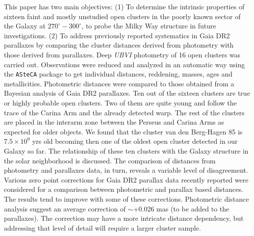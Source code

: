 \documentclass[draft]{aa}
\begin{document}
\abstract
{}
{This paper has two main objectives:
(1) To determine the intrinsic properties of sixteen faint and mostly
unstudied open clusters in the poorly known sector
of the Galaxy at $270^\circ-300^\circ$, to probe the Milky Way
structure in future investigations.
(2) To address previously reported systematics in Gaia DR2 parallaxes by
comparing the cluster distances derived from photometry with
those derived from parallaxes.
}
%
{Deep \textit{UBVI} photometry of 16 open clusters was carried out.
Observations were reduced and analyzed in an automatic way using the 
\texttt{ASteCA} package to get individual distances, reddening,
masses, ages and metallicities. Photometric distances were compared to
those obtained from a Bayesian analysis of Gaia DR2 parallaxes.
}
%
{Ten out of the sixteen clusters are true or highly probable open
clusters. Two of them are quite young and follow the trace of the Carina Arm
and the already detected warp.
The rest of the clusters are placed in the interarm zone between the
Perseus and Carina Arms as expected for older objects.
We found that the cluster van den Berg-Hagen 85 is $7.5\times10^9$ yrs
old becoming then one of the oldest open cluster detected in our Galaxy so
far.
%
The relationship of these ten clusters with the Galaxy structure in
the solar neighborhood is discussed.
The comparison of distances from photometry and parallaxes data, in turn,
reveals a variable level of disagreement.
}
%
{
Various zero point corrections for Gaia DR2 parallax data recently
reported were considered for a comparison between photometric and
parallax based distances.
The results tend to improve with some of these corrections. 
Photometric distance analysis suggest an average correction of
$\sim$+0.026 mas (to be added to the parallaxes).
%
The correction may have a more intricate distance dependency, but addressing
that level of detail will require a larger cluster sample.
}


\maketitle
\end{document}

